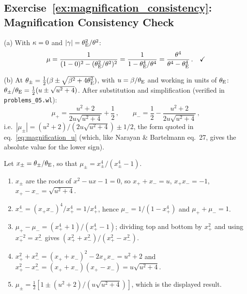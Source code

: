 \subsection*{Exercise~\ref{ex:magnification_consistency}: Magnification Consistency Check}

(a) With $\kappa = 0$ and $|\gamma| = \theta_{\mathrm{E}}^2/\theta^2$:
\begin{equation*}
    \mu = \frac{1}{(1 - 0)^2 - (\theta_{\mathrm{E}}^2/\theta^2)^2}
    = \frac{1}{1 - \theta_{\mathrm{E}}^4/\theta^4}
    = \frac{\theta^4}{\theta^4 - \theta_{\mathrm{E}}^4} \,. \quad \checkmark
\end{equation*}

(b) At $\theta_\pm = \frac{1}{2}(\beta \pm \sqrt{\beta^2 + 4\theta_{\mathrm{E}}^2})$,
with $u = \beta/\theta_{\mathrm{E}}$ and working in units of $\theta_{\mathrm{E}}$:
$\theta_\pm/\theta_{\mathrm{E}} = \frac{1}{2}(u \pm \sqrt{u^2 + 4})$.
After substitution and simplification (verified in \texttt{problems\_05.wl}):
\begin{equation*}
    \mu_+ = \frac{u^2 + 2}{2u\sqrt{u^2+4}} + \frac{1}{2} \,, \qquad
    \mu_- = \frac{1}{2} - \frac{u^2 + 2}{2u\sqrt{u^2+4}} \,,
\end{equation*}
i.e.\ $|\mu_\pm| = (u^2+2)/(2u\sqrt{u^2+4}) \pm 1/2$, the form quoted in
eq.~\eqref{eq:magnification_u} (which, like Narayan \& Bartelmann
eq.~27, gives the absolute value for the lower sign). \checkmark
\begin{derivation}
Let $x_\pm = \theta_\pm/\theta_{\mathrm{E}}$, so that $\mu_\pm = x_\pm^4/(x_\pm^4 - 1)$.
\begin{enumerate}
    \item $x_\pm$ are the roots of $x^2 - ux - 1 = 0$, so
          $x_+ + x_- = u$, $x_+x_- = -1$, $x_+ - x_- = \sqrt{u^2+4}$.
    \item $x_-^4 = (x_+x_-)^4/x_+^4 = 1/x_+^4$, hence
          $\mu_- = 1/(1 - x_+^4)$ and $\mu_+ + \mu_- = 1$.
    \item $\mu_+ - \mu_- = (x_+^4 + 1)/(x_+^4 - 1)$; dividing top and
          bottom by $x_+^2$ and using $x_+^{-2} = x_-^2$ gives
          $(x_+^2 + x_-^2)/(x_+^2 - x_-^2)$.
    \item $x_+^2 + x_-^2 = (x_+ + x_-)^2 - 2x_+x_- = u^2 + 2$ and
          $x_+^2 - x_-^2 = (x_+ + x_-)(x_+ - x_-) = u\sqrt{u^2+4}$.
    \item $\mu_\pm = \tfrac12[1 \pm (u^2+2)/(u\sqrt{u^2+4})]$, which is the
          displayed result.
\end{enumerate}
\end{derivation}

